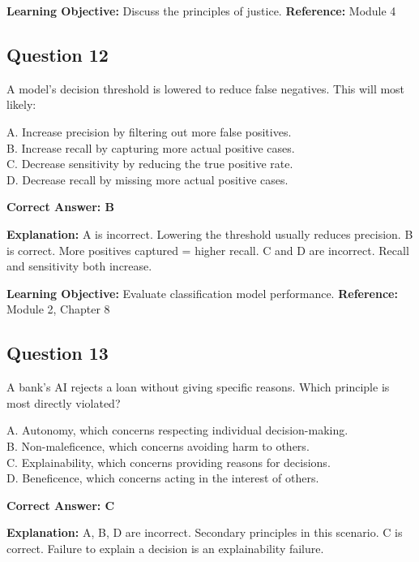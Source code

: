 \documentclass[11pt]{article}
\begin{document}
	\textbf{Learning Objective:} Discuss the principles of justice.
	\textbf{Reference:} Module 4
	
	\subsection*{Question 12}
	A model's decision threshold is lowered to reduce false negatives. This
	will most likely:
	
	A. Increase precision by filtering out more false positives.\\
	B. Increase recall by capturing more actual positive cases.\\
	C. Decrease sensitivity by reducing the true positive rate.\\
	D. Decrease recall by missing more actual positive cases.
	
	\vspace{0.4em}
	\textbf{Correct Answer: B}
	
	\textbf{Explanation:}
	A is incorrect. Lowering the threshold usually reduces precision.
	B is correct. More positives captured = higher recall.
	C and D are incorrect. Recall and sensitivity both increase.
	
	\textbf{Learning Objective:} Evaluate classification model performance.
	\textbf{Reference:} Module 2, Chapter 8
	
	\subsection*{Question 13}
	A bank's AI rejects a loan without giving specific reasons. Which
	principle is most directly violated?
	
	A. Autonomy, which concerns respecting individual decision-making.\\
	B. Non-maleficence, which concerns avoiding harm to others.\\
	C. Explainability, which concerns providing reasons for decisions.\\
	D. Beneficence, which concerns acting in the interest of others.
	
	\vspace{0.4em}
	\textbf{Correct Answer: C}
	
	\textbf{Explanation:}
	A, B, D are incorrect. Secondary principles in this scenario.
	C is correct. Failure to explain a decision is an explainability failure.
	
\end{document}
